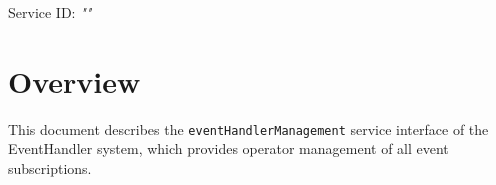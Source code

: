 \documentclass[a4paper]{arrowhead}
\begin{document}
\sloppy

\ArrowheadSetup

\begin{center}
  \vspace*{1cm}
  \huge{\arrowtitle}

  \vspace*{0.2cm}
  \LARGE{\arrowtype}
  \vspace*{1cm}

  \Large{Service ID: \textit{"\arrowid"}}

  \vspace*{\fill}


  \vspace*{1cm}
  \vspace*{\fill}

  \begin{abstract}
    This document describes the HTTP/1.1 protocol with TLS payload security and JSON payload encoding variant of the \texttt{event\allowbreak{}Handler\allowbreak{}Management} service of the EventHandler system.
  \end{abstract}

  \vspace*{1cm}
\end{center}

\newpage

\tableofcontents
\newpage

\section{Overview}
\label{sec:overview}

This document describes the \texttt{event\allowbreak{}Handler\allowbreak{}Management} service interface of the EventHandler system, which provides operator management of all event subscriptions.
\end{document}
